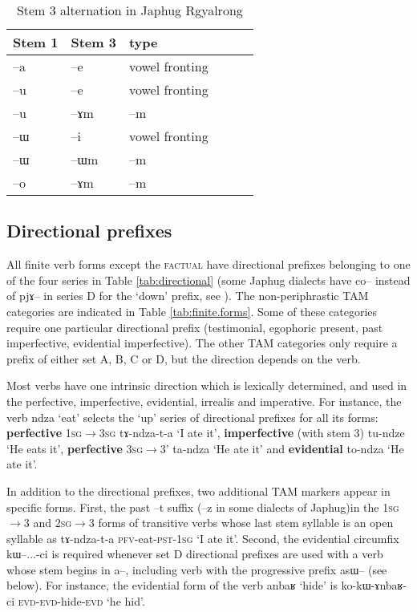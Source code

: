 \documentclass[oldfontcommands,oneside,a4paper,11pt]{article}
\newcommand{\ipa}[1]{{\phon#1}} %
\begin{document}
 \begin{table} 
\caption{Stem 3 alternation in Japhug Rgyalrong} \label{tab:stem3} \centering
\begin{tabular}{llllll}
\toprule
Stem 1 & Stem 3& type \\
\midrule
 \ipa{--a} & \ipa{--e} & vowel fronting\\
 \ipa{--u} & \ipa{--e} & vowel fronting\\
\ipa{--u} & \ipa{--ɤm} & \ipa{--m} \\
\ipa{--ɯ} & \ipa{--i} & vowel fronting\\
\ipa{--ɯ} & \ipa{--ɯm} & \ipa{--m}\\
\ipa{--o} & \ipa{--ɤm} & \ipa{--m} \\
\bottomrule
\end{tabular}
\end{table}




\subsection{Directional prefixes}
All finite verb forms except the \textsc{factual} have directional prefixes belonging to one of the four series in Table \ref{tab:directional} (some Japhug dialects have \ipa{co--} instead of \ipa{pjɤ--} in series D for the `down' prefix, see \citealt{linluo03}). The non-periphrastic TAM categories are indicated in Table \ref{tab:finite.forms}. Some of these categories require one particular directional prefix (testimonial, egophoric present, past imperfective, evidential imperfective). The other TAM categories only require a prefix of either set A, B, C or D, but the direction depends on the verb.

Most verbs have one intrinsic direction which is lexically determined, and used in the perfective, imperfective, evidential, irrealis and imperative. For instance, the verb \ipa{ndza} `eat' selects the `up' series of directional prefixes for all its forms: \textbf{perfective} \textsc{1sg$\rightarrow$3sg} \ipa{tɤ-ndza-t-a} `I ate it', \textbf{imperfective} (with stem 3) \ipa{tu-ndze} `He eats it', \textbf{perfective} \textsc{3sg$\rightarrow$3'} \ipa{ta-ndza} `He ate it' and \textbf{evidential} \ipa{to-ndza} `He ate it'. 

In addition to the directional prefixes, two additional TAM markers appear in specific forms. First, the past \ipa{--t} suffix (\ipa{--z} in some dialects of Japhug)in the \textsc{1sg}$\rightarrow$3 and \textsc{2sg}$\rightarrow$3 forms of transitive verbs whose last stem syllable is an open syllable as \ipa{tɤ-ndza-t-a} \textsc{pfv}-eat-\textsc{pst-1sg} `I ate it'. Second, the evidential circumfix \ipa{kɯ--...-ci} is required whenever set D directional prefixes are used with a verb whose stem begins in \ipa{a--}, including verb with the progressive prefix \ipa{asɯ--} (see below). For instance, the evidential form of the verb \ipa{anbaʁ} `hide' is \ipa{ko-kɯ-ɤnbaʁ-ci} \textsc{evd-evd}-hide-\textsc{evd} `he hid'.
\end{document}
